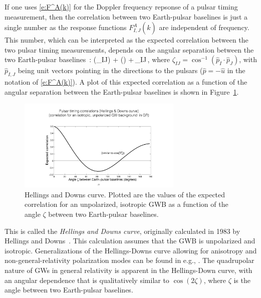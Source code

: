 If one uses \eqref{e:F^A(k)} for the Doppler frequency
repsonse of a pulsar timing measurement, then the correlation
between two Earth-pulsar baselines is just a single number as 
the response functions $F^A_{I,J}(\hat k)$ are independent of
frequency.
This number, which can be interpreted as the expected
correlation between the two pulsar timing measurements, 
depends on the angular separation between the two 
Earth-pulsar baselines~\cite{Hellings-Downs:1983}:
%
\be
\chi(\zeta_{IJ})\equiv
{} + \left(\right)
+\,\delta_{IJ}\,,
\label{e:HD}
\ee
%
where $\zeta_{IJ} = \cos^{-1}(\hat p_I\cdot\hat p_J)$, with 
$\hat p_{I,J}$ being unit vectors pointing in the directions
to the pulsars ($\hat p=-\hat u$ in the notation 
of \eqref{e:F^A(k)}).
A plot of this expected correlation as a function of the 
angular separation between the Earth-pulsar baselines is
shown in Figure~\ref{f:HD_curve}.
%
\begin{figure}[htbp!]
\begin{center}
\includegraphics[width=0.7\textwidth]{Figures/HD_curve}
\caption{Hellings and Downs curve.
Plotted are the values of the expected correlation for 
an unpolarized,
isotropic GWB as a function of the angle $\zeta$ between
two Earth-pulsar baselines.}
\label{f:HD_curve}
\end{center}
\end{figure}
%
This is called the {\em Hellings and Downs curve}, originally 
calculated in 1983 by Hellings and Downs~\cite{Hellings-Downs:1983}.
This calculation assumes that the GWB is unpolarized
and isotropic.
Generalizations of the Hellings-Downs curve allowing for 
anisotropy and non-general-relativity polarization modes
can be found in e.g., \cite{Mingarelli-et-al:2013, 
Gair-et-al:2014, Lee-et-al:2007, Chamberlin-Siemens:2012, Gair-et-al:2015}.
The quadrupolar nature of GWs in general relativity is
apparent in the Hellings-Down curve, with an angular dependence
that is qualitatively similar to $\cos(2\zeta)$, where 
$\zeta$ is the angle between two Earth-pulsar baselines.

